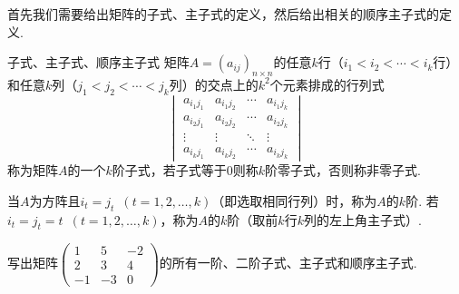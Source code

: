 首先我们需要给出矩阵的子式、主子式的定义，然后给出相关的顺序主子式的定义.
\begin{definition}{}{子式、主子式、顺序主子式}
    矩阵$A=(a_{ij})_{n \times n}$的任意$k$行（$i_1<i_2<\cdots<i_k$行）和任意$k$列（$j_1<j_2<\cdots<j_k$列）的交点上的$k^2$个元素排成的行列式
    \[\begin{vmatrix}
            a_{i_1j_1} & a_{i_1j_2} & \cdots & a_{i_1j_k} \\
            a_{i_2j_1} & a_{i_2j_2} & \cdots & a_{i_2j_k} \\
            \vdots     & \vdots     & \ddots & \vdots     \\
            a_{i_kj_1} & a_{i_kj_2} & \cdots & a_{i_kj_k}
        \end{vmatrix}\]
    称为矩阵$A$的一个$k$阶子式，若子式等于0则称$k$阶零子式，否则称非零子式.

    当$A$为方阵且$i_t=j_t\enspace(t=1,2,\ldots,k)$（即选取相同行列）时，称为$A$的$k$阶. 若$i_t=j_t=t\enspace(t=1,2,\ldots,k)$，称为$A$的$k$阶（取前$k$行$k$列的左上角主子式）.
\end{definition}

\begin{example}{}{}
    写出矩阵$\begin{pmatrix}
            1 & 5 & -2 \\ 2 & 3 & 4 \\ -1 & -3 & 0
        \end{pmatrix}$的所有一阶、二阶子式、主子式和顺序主子式.
\end{example}

